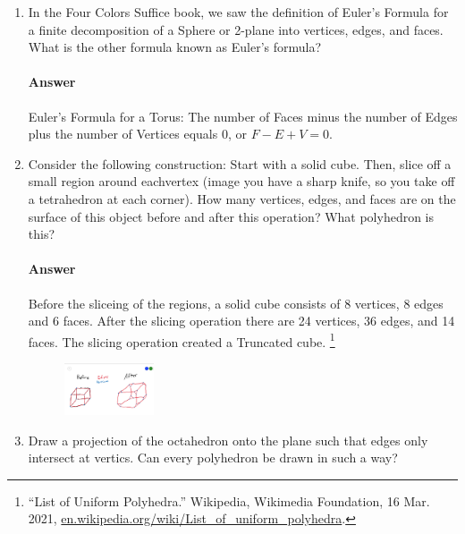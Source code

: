 \documentclass{article}
\begin{document}
\begin{enumerate}

    \item In the Four Colors Suffice book, we saw the definition of Euler's
        Formula for a finite decomposition of a Sphere or 2-plane into vertices,
        edges, and faces.  What is the other formula known as Euler's formula?

        \paragraph{Answer}

        Euler's Formula for a Torus: The number of Faces minus the number of Edges plus the number of Vertices equals 0, or $F-E+V=0$.



    \item  Consider the following construction: Start with a solid cube.  Then, slice
        off a small region around eachvertex (image you have a sharp knife, so you take
        off a tetrahedron at each corner).  How many vertices, edges, and faces are on
        the surface of this object before and after this operation? What polyhedron is this?

        \paragraph{Answer}

        Before the sliceing of the regions, a solid cube consists of 8 vertices, 8 edges and 6 faces. After the slicing operation there are 24 vertices, 36 edges, and 14 faces. The slicing operation created a Truncated cube. \footnote{“List of Uniform Polyhedra.” Wikipedia, Wikimedia Foundation, 16 Mar. 2021, \url{en.wikipedia.org/wiki/List_of_uniform_polyhedra}.}


		\begin{figure}[h]
		\centering
			\includegraphics[width=0.25\textwidth]{HW_5_3-2}
		\end{figure}




    \item Draw a projection of the octahedron onto the plane such that edges only
        intersect at vertics.  Can every polyhedron be drawn in such a way?


\end{enumerate}
\end{document}
